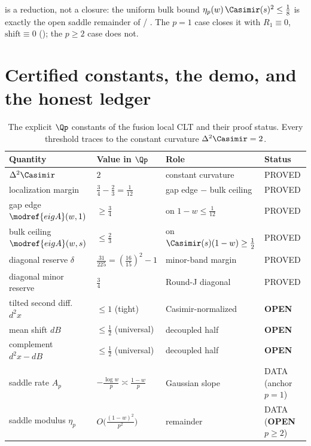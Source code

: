 \begin{remark}
\label{rem:core-b-gap-wiring}
 is a reduction, not a closure: the uniform bulk bound
$\eta_p(w)\,\Casimir(s)^{2}\le\tfrac18$ is exactly the open saddle remainder of
 / .  The $p=1$ case closes it
with $R_1\equiv0$, $\mathrm{shift}\equiv0$ (); the $p\ge 2$ case
does not.
\end{remark}

\section{Certified constants, the demo, and the honest ledger}
\label{sec:core-b-ledger}

\begin{table}[t]
\centering
\begin{tabular}{@{}llll@{}}
\toprule
Quantity & Value in $\Qp$ & Role & Status \\
\midrule
$\Delta^2\Casimir$ & $2$ & constant curvature & PROVED \\
localization margin & $\tfrac34-\tfrac23=\tfrac1{12}$ & gap edge $-$ bulk ceiling & PROVED \\
gap edge $\modref{eigA}(w,1)$ & $\ge\tfrac34$ & on $1-w\le\tfrac1{12}$ & PROVED \\
bulk ceiling $\modref{eigA}(w,s)$ & $\le\tfrac23$ & on $\Casimir(s)(1-w)\ge\tfrac12$ & PROVED \\
diagonal reserve $\delta$ & $\tfrac{31}{225}=(\tfrac{16}{15})^2-1$ & minor-band margin & PROVED \\
diagonal minor reserve & $\tfrac34$ & Round-J diagonal & PROVED \\
tilted second diff.\ $d^2x$ & $\le 1$ (tight) & Casimir-normalized & \textbf{OPEN} \\
mean shift $dB$ & $\le\tfrac12$ (universal) & decoupled half & \textbf{OPEN} \\
complement $d^2x-dB$ & $\le\tfrac12$ (universal) & decoupled half & \textbf{OPEN} \\
saddle rate $A_p$ & $-\tfrac{\log w}{p}\asymp\tfrac{1-w}{p}$ & Gaussian slope & DATA (anchor $p{=}1$) \\
saddle modulus $\eta_p$ & $O\!\bigl(\tfrac{(1-w)^2}{p^2}\bigr)$ & remainder & DATA (\textbf{OPEN} $p{\ge}2$) \\
\bottomrule
\end{tabular}
\caption{The explicit $\Qp$ constants of the fusion local CLT and their proof
status.  Every threshold traces to the constant curvature $\Delta^2\Casimir=2$.}
\label{tab:core-b-constants}
\end{table}

